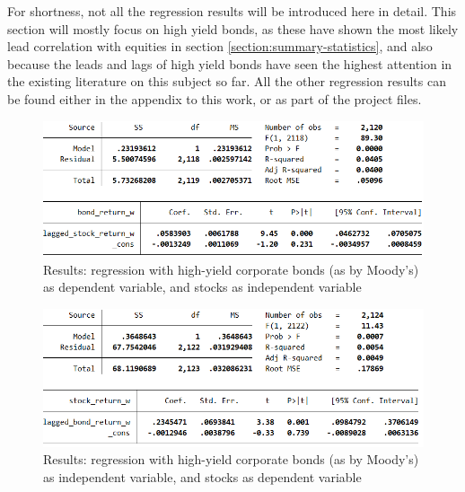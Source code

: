 For shortness, not all the regression results will be introduced here in detail. This section will mostly focus on high yield bonds, as these have shown the most likely lead correlation with equities in section \ref{section:summary-statistics}, and also because the leads and lags of high yield bonds have seen the highest attention in the existing literature on this subject so far. All the other regression results can be found either in the appendix to this work, or as part of the project files. %

\begin{figure}[h]
	\centering
	\includegraphics[trim={0 0 0 0},clip,width=1.0\linewidth]{figures/regression-results/regression-high-yield-ccc-d-moodies-bonds-as-dependent.PNG}
	\caption{Results: regression with high-yield corporate bonds (as by Moody's) as dependent variable, and stocks as independent variable}
	\label{fig:regression-high-yield-ccc-d-moodies-bonds-as-dependent.PNG}
\end{figure}

\begin{figure}[h]
	\centering
	\includegraphics[trim={0 0 0 0},clip,width=1.0\linewidth]{figures/regression-results/regression-high-yield-ccc-d-moodies-stocks-as-dependent.PNG}
	\caption{Results: regression with high-yield corporate bonds (as by Moody's) as independent variable, and stocks as dependent variable}
	\label{fig:regression-high-yield-ccc-d-moodies-stocks-as-dependent.PNG}
\end{figure}








